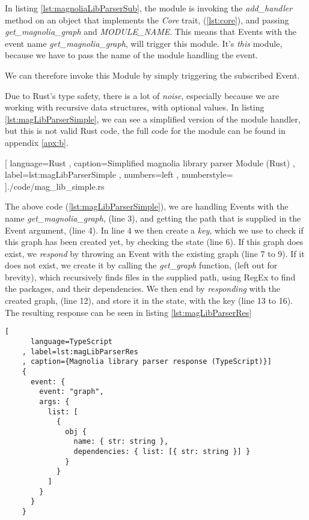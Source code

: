 In listing \ref{lst:magnoliaLibParserSub}, the module is invoking the
\textit{add\_handler} method on an object that implements the \textit{Core} trait,
(\ref{lst:core}), and passing \textit{get\_magnolia\_graph} and
\textit{MODULE\_NAME}. This means that Events with the event name
\textit{get\_magnolia\_graph}, will trigger this module. It's \textit{this}
module, because we have to pass the name of the module handling the event.

We can therefore invoke this Module by simply triggering the subscribed Event.

Due to Rust's type safety, there is a lot of \textit{noise}, especially because
we are working with recursive data structures, with optional values. In listing
\ref{lst:magLibParserSimple}, we can see a simplified version of the module
handler, but this is not valid Rust code, the full code for the module can be
found in appendix \ref{apx:b}.

\begin{code}[H]
  
    [ language=Rust
    , caption={Simplified magnolia library parser Module (Rust)}
    , label=lst:magLibParserSimple
    , numbers=left
    , numberstyle=\tiny\color{gray}
    ]{./code/mag\_lib\_simple.rs}
\end{code}

The above code (\ref{lst:magLibParserSimple}), we are handling Events with the name
\textit{get\_magnolia\_graph}, (line 3), and getting the path that is supplied in
the Event argument, (line 4). In line 4 we then create a \textit{key}, which we
use to check if this graph has been created yet, by checking the state (line 6).
If this graph does exist, we \textit{respond} by throwing an Event with the
existing graph (line 7 to 9). If it does not exist, we create it by calling the
\textit{get\_graph} function, (left out for brevity), which recursively finds
files in the supplied path, using RegEx to find the packages, and their
dependencies. We then end by \textit{responding} with the created graph,
(line 12), and store it in the state, with the key (line 13 to 16). The
resulting response can be seen in listing \ref{lst:magLibParserRes}

\begin{code}[H]
  \begin{lstlisting}[
      language=TypeScript
    , label=lst:magLibParserRes
    , caption={Magnolia library parser response (TypeScript)}]
    {
      event: {
        event: "graph",
        args: {
          list: [
            {
              obj {
                name: { str: string },
                dependencies: { list: [{ str: string }] }
              }
            }
          ]
        }
      }
    }
  \end{lstlisting}
\end{code}

